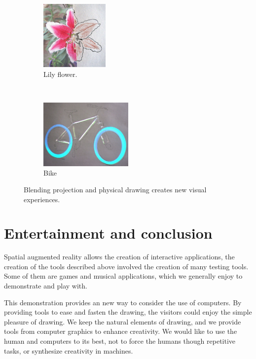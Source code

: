 \documentclass{article}
\begin{document}
\begin{figure}[!h]
        \begin{subfigure}[b]{0.20\textwidth}
                \centering
                \includegraphics[height=3.4cm]{lys}
                \caption{Lily flower.}
                \label{fig:lys}
        \end{subfigure}%
        ~ %
        \begin{subfigure}[b]{0.25\textwidth}
                \centering
                \includegraphics[height=3.4cm]{velo2}
                \caption{Bike}
                \label{fig:point}
        \end{subfigure}
        \caption{Blending projection and physical drawing creates new visual experiences.}\label{fig:inter}
\end{figure}



\section{Entertainment and conclusion}
Spatial augmented reality allows the creation of interactive applications, the creation of the tools described above involved the creation of many testing tools. Some of them are games and musical applications, which we generally enjoy to demonstrate and play with. 

This demonstration provides an new way to consider the use of computers. By providing tools to ease and fasten the drawing, the visitors could enjoy the simple pleasure of drawing. We keep the natural elements of drawing, and we provide tools from computer graphics to enhance creativity. We would like to use the human and computers to its best, not to force the humans though repetitive tasks, or synthesize creativity in machines. 




\end{document}
